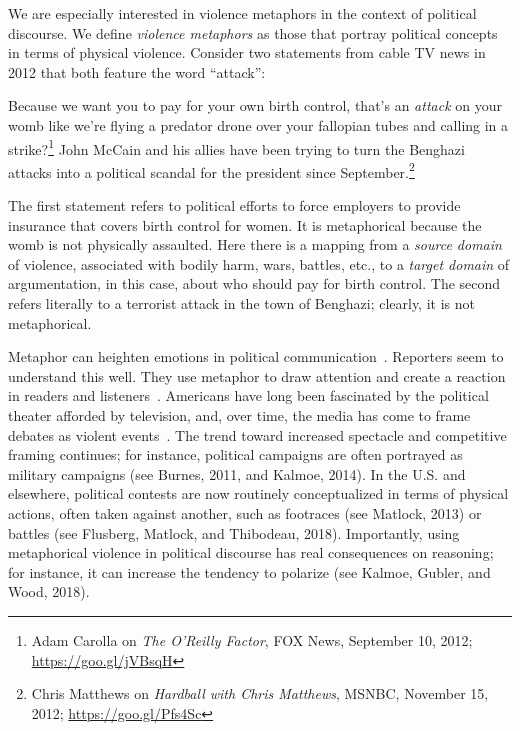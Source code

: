 We are especially interested in violence
metaphors in the context of political discourse. We define \emph{violence
metaphors} as those that portray political concepts in terms of physical
violence. Consider two statements from cable TV news in 2012 that both feature the
word ``attack'':
\begin{exe} \ex Because we want you to pay for your own birth control,
  that's an \emph{attack} on your womb like we're flying a predator drone over your
  fallopian tubes and calling in a strike?\footnote{Adam Carolla on \emph{The
  O'Reilly Factor}, FOX News, September 10, 2012; \url{https://goo.gl/jVBsqH}}
  \label{ex:carolla} 
  \ex John McCain and his allies have been trying to turn the
  Benghazi attacks into a political scandal for the president since
  September.\footnote{Chris Matthews on \emph{Hardball with Chris Matthews},
  MSNBC, November 15, 2012; \url{https://goo.gl/Pfs4Sc}}
\label{ex:benghazi-attacks} \end{exe} The first statement refers to political
efforts to force employers to provide insurance that covers birth control for
women.  It is metaphorical because the
womb is not physically assaulted. Here there is a mapping from a \emph{source domain} of  violence,
associated with bodily harm, wars, battles, etc., to  a \emph{target domain} of
argumentation, in this case, about who should pay for birth control. The second
refers literally to a terrorist attack in the town of Benghazi;
clearly, it is not metaphorical. 

Metaphor can heighten emotions in political
communication~\cite{Charteris-Black2009}. Reporters seem to understand this
well.  They use metaphor to draw attention and create a reaction in readers and
listeners~\cite{Lakoff2008}. Americans have long been fascinated by the
political theater afforded by television, and, over time, the media has come to
frame debates as violent events~\cite{Schroeder2008}. The trend toward increased
spectacle and competitive framing continues; 
for instance, political campaigns are often portrayed as
military campaigns (see Burnes, 2011, and Kalmoe, 2014). In the U.S. and
elsewhere, political contests are now routinely conceptualized in terms of
physical actions, often taken against another, such as footraces
(see Matlock, 2013) or battles (see Flusberg, Matlock, and Thibodeau, 2018). 
Importantly, using metaphorical violence in political discourse has 
real consequences on reasoning; for instance, it can increase the tendency to polarize
(see Kalmoe, Gubler, and Wood, 2018).

